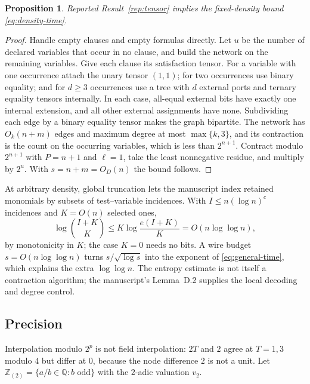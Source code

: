 \documentclass[11pt,reqno]{amsart}
\numberwithin{equation}{section}
\theoremstyle{plain}
\newtheorem{proposition}[theorem]{Proposition}
\theoremstyle{definition}
\theoremstyle{remark}
\newcommand{\Z}{\mathbb Z}
\newcommand{\Q}{\mathbb Q}
\newcommand{\valtwo}{v_2}
\begin{document}
\begin{proposition}\label{prop:tensor-sat}
Reported Result~\ref{rep:tensor} implies the fixed-density bound
\eqref{eq:density-time}.
\end{proposition}
\begin{proof}
Handle empty clauses and empty formulas directly. Let $u$ be the number of
declared variables that occur in no clause, and build the network on the
remaining variables. Give each clause its satisfaction tensor. For a
variable with one occurrence attach the unary tensor $(1,1)$; for two
occurrences use binary equality; and for $d\ge3$ occurrences use a tree with
$d$ external ports and ternary equality tensors internally. In each case,
all-equal external bits have exactly one internal extension, and all other
external assignments have none. Subdividing each edge by a binary equality
tensor makes the graph bipartite. The network has
$O_k(n+m)$ edges and maximum degree at most $\max\{k,3\}$, and its contraction
is the count on the occurring variables, which is less than $2^{n+1}$.
Contract modulo $2^{n+1}$ with $P=n+1$ and $\ell=1$, take the least
nonnegative residue, and multiply by $2^u$. With $s=n+m=O_D(n)$ the bound
follows.
\end{proof}

At arbitrary density, global truncation lets the manuscript index retained
monomials by subsets of test--variable incidences. With $I\le n(\log n)^c$
incidences and $K=O(n)$ selected ones,
\begin{equation}\label{eq:wire-budget}
 \log\binom{I+K}{K}\le K\log\frac{e(I+K)}K=O(n\log\log n),
\end{equation}
by monotonicity in $K$; the case $K=0$ needs no bits. A wire budget
$s=O(n\log\log n)$ turns $s/\sqrt{\log s}$ into the exponent of
\eqref{eq:general-time}, which explains the extra $\log\log n$. The entropy
estimate is not itself a contraction algorithm; the manuscript's Lemma~D.2
supplies the local decoding and degree control.

\subsection{Precision}
Interpolation modulo $2^p$ is not field interpolation: $2T$ and $2$ agree at
$T=1,3$ modulo $4$ but differ at $0$, because the node difference $2$ is not a
unit. Let $\Z_{(2)}=\{a/b\in\Q:b\text{ odd}\}$ with the $2$-adic valuation
$\valtwo$.
\end{document}
